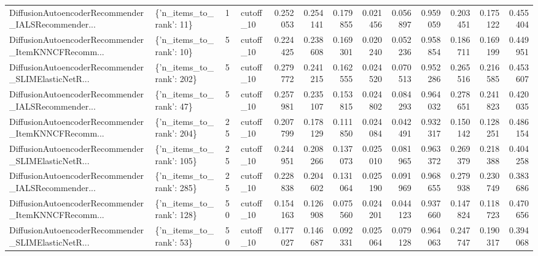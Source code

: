 \begin{tabular}{llllrrrrrrrrr}
DiffusionAutoencoderRecommender\_IALSRecommender... &  \{'n\_items\_to\_rank': 11\} &        1 & cutoff\_10 & 0.252053 &   0.254141 & 0.179855 & 0.021456 &        0.056897 &                   0.959059 &       0.203451 &           0.175122 &            0.455404 \\
DiffusionAutoencoderRecommender\_ItemKNNCFRecomm... &  \{'n\_items\_to\_rank': 10\} &        5 & cutoff\_10 & 0.224425 &   0.238608 & 0.169301 & 0.020240 &        0.052236 &                   0.958854 &       0.186711 &           0.169199 &            0.449951 \\
DiffusionAutoencoderRecommender\_SLIMElasticNetR... & \{'n\_items\_to\_rank': 202\} &        5 & cutoff\_10 & 0.279772 &   0.241215 & 0.162555 & 0.024520 &        0.070513 &                   0.952286 &       0.265516 &           0.216585 &            0.453607 \\
DiffusionAutoencoderRecommender\_IALSRecommender... &  \{'n\_items\_to\_rank': 47\} &        5 & cutoff\_10 & 0.257981 &   0.235107 & 0.153815 & 0.024802 &        0.084293 &                   0.964032 &       0.278651 &           0.241823 &            0.420035 \\
DiffusionAutoencoderRecommender\_ItemKNNCFRecomm... & \{'n\_items\_to\_rank': 204\} &       25 & cutoff\_10 & 0.207799 &   0.178129 & 0.111850 & 0.024084 &        0.042491 &                   0.932317 &       0.150142 &           0.128251 &            0.486154 \\
DiffusionAutoencoderRecommender\_SLIMElasticNetR... & \{'n\_items\_to\_rank': 105\} &       25 & cutoff\_10 & 0.244951 &   0.208266 & 0.137073 & 0.025010 &        0.081965 &                   0.963372 &       0.269379 &           0.218388 &            0.404258 \\
DiffusionAutoencoderRecommender\_IALSRecommender... & \{'n\_items\_to\_rank': 285\} &       25 & cutoff\_10 & 0.228838 &   0.204602 & 0.131064 & 0.025190 &        0.091969 &                   0.968655 &       0.279938 &           0.230749 &            0.383686 \\
DiffusionAutoencoderRecommender\_ItemKNNCFRecomm... & \{'n\_items\_to\_rank': 128\} &       50 & cutoff\_10 & 0.154163 &   0.126908 & 0.075560 & 0.024201 &        0.044123 &                   0.937660 &       0.147824 &           0.118723 &            0.470656 \\
DiffusionAutoencoderRecommender\_SLIMElasticNetR... &  \{'n\_items\_to\_rank': 53\} &       50 & cutoff\_10 & 0.177027 &   0.146687 & 0.092331 & 0.025064 &        0.079128 &                   0.964063 &       0.247747 &           0.190317 &            0.394068 \\

\end{tabular}
